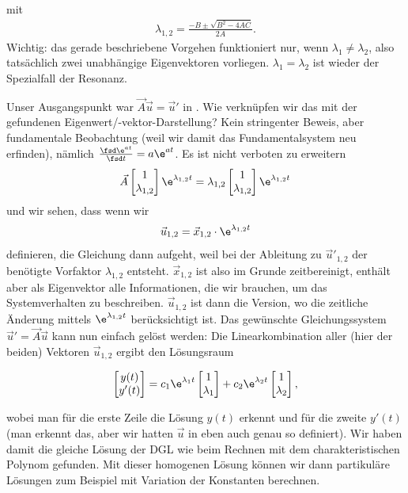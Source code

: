 %
mit
\begin{align}
\lambda_{1,2} = \frac{-B \pm \sqrt{B^2-4 A C}}{2 A}.
\end{align}
%
Wichtig: das gerade beschriebene Vorgehen funktioniert nur, wenn
$\lambda_1 \neq \lambda_2$, also tatsächlich zwei unabhängige Eigenvektoren vorliegen.
%
$\lambda_1 = \lambda_2$ ist wieder der Spezialfall der Resonanz.

Unser Ausgangspunkt war $\vec{A}  \vec{u} = \vec{u}'$ in .
Wie verknüpfen wir das mit der gefundenen Eigenwert/-vektor-Darstellung?
%
Kein stringenter Beweis, aber fundamentale Beobachtung
(weil wir damit das Fundamentalsystem neu erfinden), nämlich
$\frac{\fsd \e^{a t}}{\fsd t} = a \e^{a t}$.
%
Es ist nicht verboten zu erweitern
\begin{align}
\vec{A}
\begin{bmatrix}
1 \\ \lambda_{1,2}
\end{bmatrix}
\e^{\lambda_{1,2} t}
= \lambda_{1,2}
\begin{bmatrix}
1 \\ \lambda_{1,2}
\end{bmatrix}
\e^{\lambda_{1,2} t}
\end{align}
und wir sehen, dass wenn wir
\begin{align}
\vec{u}_{1,2} = \vec{x}_{1,2} \cdot \e^{\lambda_{1,2} t}
\end{align}
definieren, die Gleichung  dann aufgeht, weil bei der Ableitung zu
$\vec{u}'_{1,2}$ der benötigte Vorfaktor $\lambda_{1,2}$ entsteht.
%
$\vec{x}_{1,2}$ ist also im Grunde zeitbereinigt, enthält aber als Eigenvektor
alle Informationen, die wir brauchen, um das Systemverhalten zu beschreiben.
%
$\vec{u}_{1,2}$ ist dann die Version, wo die zeitliche Änderung mittels
$\e^{\lambda_{1,2} t}$ berücksichtigt ist.
%
Das gewünschte Gleichungssystem $\vec{u}'=\vec{A}  \vec{u}$ kann nun einfach
gelöst werden:
%
Die Linearkombination aller (hier der beiden) Vektoren $\vec{u}_{1,2}$ ergibt den
Lösungsraum
\begin{mdframed}[backgroundcolor=C3!10]
\begin{align}
\begin{bmatrix}
y(t) \\ y'(t)
\end{bmatrix} =
c_1 \e^{\lambda_1 t}
\begin{bmatrix}
1 \\ \lambda_{1}
\end{bmatrix}
+
c_2 \e^{\lambda_2 t}
\begin{bmatrix}
1 \\ \lambda_{2}
\end{bmatrix},
\end{align}
\end{mdframed}
%
wobei man für die erste Zeile die Lösung $y(t)$ erkennt und für die zweite $y'(t)$
(man erkennt das, aber wir hatten $\vec{u}$ in 
eben auch genau so definiert).
%
Wir haben damit die gleiche Lösung der DGL wie beim Rechnen mit dem
charakteristischen Polynom gefunden.
%
Mit dieser homogenen Lösung können wir dann partikuläre Lösungen zum Beispiel mit
Variation der Konstanten berechnen.


